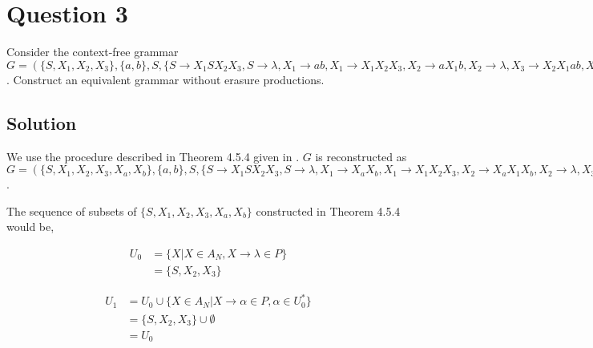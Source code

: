 
\section*{Question 3}

Consider the context-free grammar $ G = (\{S,X_1,X_2,X_3\},\{a,b\},S,\{S\rightarrow X_1 S X_2 X_3, S\rightarrow \lambda, X_1 \rightarrow ab, X_1 \rightarrow X_1 X_2 X_3, X_2 \rightarrow a X_1 b, X_2 \rightarrow \lambda, X_3 \rightarrow X_2 X_1 a b, X_3 \rightarrow b, X_3 \rightarrow \lambda \})$.
Construct an equivalent grammar without erasure productions.

\subsection*{Solution}

We use the procedure described in Theorem 4.5.4 given in \cite{simovici1999theory}.
$G$ is reconstructed as $ G = (\{S,X_1,X_2,X_3, X_a, X_b\},\{a,b\},S,\{S\rightarrow X_1 S X_2 X_3, S\rightarrow \lambda, X_1 \rightarrow X_aX_b, X_1 \rightarrow X_1 X_2 X_3, X_2 \rightarrow X_a X_1 X_b, X_2 \rightarrow \lambda, X_3 \rightarrow X_2 X_1 X_a X_b, X_3 \rightarrow X_b, X_3 \rightarrow \lambda, X_a \rightarrow a, X_b \rightarrow b \})$.

The sequence of subsets of $\{S,X_1,X_2,X_3, X_a, X_b\}$ constructed in Theorem 4.5.4 would be,

\begin{equation}
\begin{aligned}
U_0 &= \{X | X\in A_N, X\rightarrow \lambda \in P\}\\
&= \{S, X_2, X_3\}
\end{aligned}
\end{equation}

\begin{equation}
\begin{aligned}
U_{1} &= U_{0} \cup \{X\in A_N | X\rightarrow \alpha \in P, \alpha \in U^*_0\}\\
&= \{S, X_2, X_3\} \cup \emptyset\\
&= U_{0}
\end{aligned}
\end{equation}

